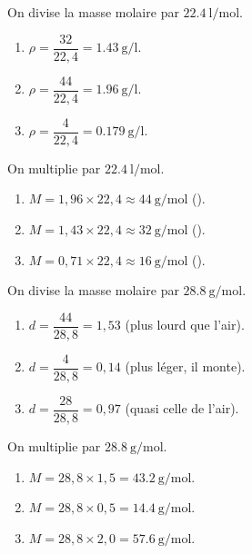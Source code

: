 \documentclass[11pt,a4paper]{article}
\begin{document}
\begin{corrige}
On divise la masse molaire par $\qty{22.4}{\litre\per\mole}$.
\begin{enumerate}[label=\alph*)]
  \item $\rho=\dfrac{32}{22{,}4}=\qty{1.43}{\gram\per\litre}$.
  \item $\rho=\dfrac{44}{22{,}4}=\qty{1.96}{\gram\per\litre}$.
  \item $\rho=\dfrac{4}{22{,}4}=\qty{0.179}{\gram\per\litre}$.
\end{enumerate}
\end{corrige}

\begin{corrige}
On multiplie par $\qty{22.4}{\litre\per\mole}$.
\begin{enumerate}[label=\alph*)]
  \item $M=1{,}96\times22{,}4\approx\qty{44}{\gram\per\mole}$ ().
  \item $M=1{,}43\times22{,}4\approx\qty{32}{\gram\per\mole}$ ().
  \item $M=0{,}71\times22{,}4\approx\qty{16}{\gram\per\mole}$ ().
\end{enumerate}
\end{corrige}

\begin{corrige}
On divise la masse molaire par $\qty{28.8}{\gram\per\mole}$.
\begin{enumerate}[label=\alph*)]
  \item $d=\dfrac{44}{28{,}8}=1{,}53$ (plus lourd que l'air).
  \item $d=\dfrac{4}{28{,}8}=0{,}14$ (plus léger, il monte).
  \item $d=\dfrac{28}{28{,}8}=0{,}97$ (quasi celle de l'air).
\end{enumerate}
\end{corrige}

\begin{corrige}
On multiplie par $\qty{28.8}{\gram\per\mole}$.
\begin{enumerate}[label=\alph*)]
  \item $M=28{,}8\times1{,}5=\qty{43.2}{\gram\per\mole}$.
  \item $M=28{,}8\times0{,}5=\qty{14.4}{\gram\per\mole}$.
  \item $M=28{,}8\times2{,}0=\qty{57.6}{\gram\per\mole}$.
\end{enumerate}
\end{corrige}
\end{document}
